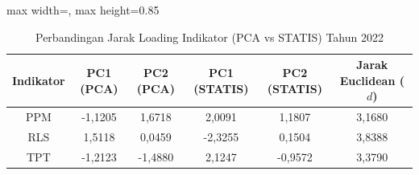 \begin{table}[H]
\centering
\caption{Perbandingan Jarak Loading Indikator (PCA vs STATIS) Tahun 2022} \label{tab:sample1jarak_loading_2022}
\begin{adjustbox}{max width=\textwidth, max height=0.85\textheight}
\begin{tabular}{|c|c|c|c|c|c|}
\hline
\textbf{Indikator} & \textbf{PC1 (PCA)} & \textbf{PC2 (PCA)} & \textbf{PC1 (STATIS)} & \textbf{PC2 (STATIS)} & \textbf{Jarak Euclidean ($d$)} \\
\hline
PPM & -1,1205 & 1,6718 & 2,0091 & 1,1807 & 3,1680 \\
RLS & 1,5118 & 0,0459 & -2,3255 & 0,1504 & 3,8388 \\
TPT & -1,2123 & -1,4880 & 2,1247 & -0,9572 & 3,3790 \\
\hline
\end{tabular}
\end{adjustbox}
\end{table}